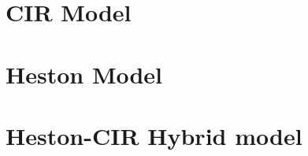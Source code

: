 \documentclass[conference]{IEEEtran}
\begin{document}

\section{CIR Model}


\section{Heston Model}


\section{Heston-CIR Hybrid model}

\end{document}
